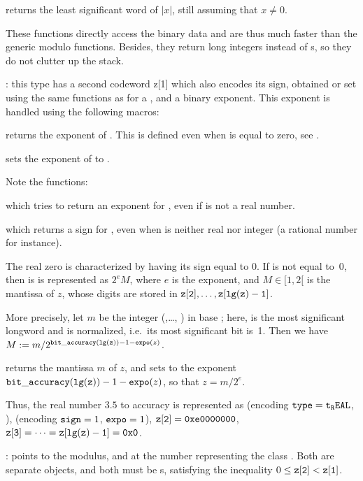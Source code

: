  returns the least significant word of $|x|$, still
assuming that $x\neq 0$.

These functions directly access the binary data and are thus much faster than
the generic modulo functions. Besides, they return long integers instead of
s, so they do not clutter up the stack.

:
this type has a second codeword z[1] which
also encodes its sign, obtained or set using the same functions as for a
, and a binary exponent. This exponent is handled using the
following macros:

 returns the exponent of .
This is defined even when  is equal to zero, see
.

 sets the exponent of  to .

\noindent Note the functions:

 which tries to return an exponent for ,
even if  is not a real number.

 which returns a sign for , even when
 is neither real nor integer (a rational number for instance).

The real zero is characterized by having its sign equal to 0. If  is
not equal to~0, then is is represented as $2^e M$, where $e$ is the exponent,
and $M\in [1, 2[$ is the mantissa of $z$, whose digits are stored in
${\tt z[2]},\dots, {\tt z[lg(z)-1]}$.

More precisely, let $m$ be the integer (,\dots, )
in base ; here,  is the most significant
longword and is normalized, i.e.~its most significant bit is~1. Then we have
$M := m / 2^{{\tt bit\_accuracy(lg(z))} - 1 - {\tt expo}(z)}$.

 returns the mantissa $m$ of $z$, and
sets  to the exponent ${\tt bit\_accuracy(lg(z))}-1-{\tt expo}(z)$,
so that $z = m / 2^e$.

Thus, the real number $3.5$ to accuracy  is
represented as  (encoding ${\tt type} = {\tt t_REAL}$, ),
 (encoding ${\tt sign} = 1$, ${\tt expo} = 1$), ${\tt z[2]} =
{\tt 0xe0000000}$, ${\tt z[3]} =\dots = {\tt z[lg(z)-1]} = {\tt 0x0}$.

:
 points to the modulus, and  at the number representing
the class . Both are separate  objects, and both must be
s, satisfying the inequality $0 \le {\tt z[2]} < {\tt z[1]}$.

